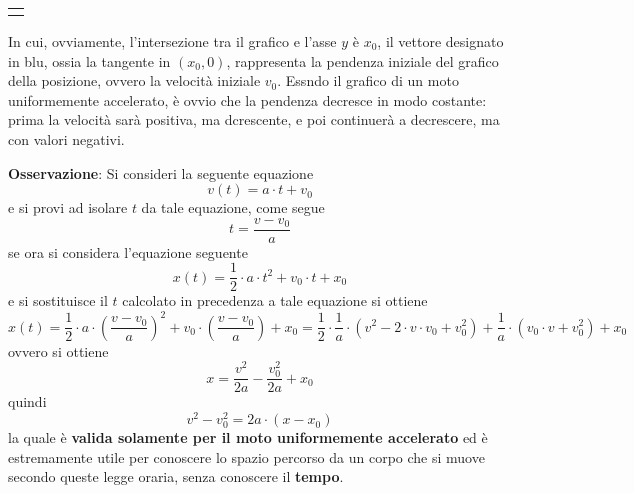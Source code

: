 \documentclass[a4paper]{extarticle}
\begin{document}
\vspace{2em}
\noindent
{}
\begin{tabularx}{\textwidth}{P}
  {
      \centering
  }
\end{tabularx}

\vspace{1em}
\noindent
In cui, ovviamente, l'intersezione tra il grafico e l'asse $y$ è $x_0$, il vettore designato in blu, ossia la tangente in $(x_0,0)$, rappresenta la pendenza iniziale del grafico della posizione, ovvero la velocità iniziale $v_0$. Essndo il grafico di un moto uniformemente accelerato, è ovvio che la pendenza decresce in modo costante: prima la velocità sarà positiva, ma dcrescente, e poi continuerà a decrescere, ma con valori negativi.

\vspace{1em}
\noindent
\textbf{Osservazione}: Si consideri la seguente equazione
\[v(t) = a \cdot t + v_0\]
e si provi ad isolare $t$ da tale equazione, come segue
\[t = \frac{v - v_0}{a}\]
se ora si considera l'equazione seguente
\[x(t) = \frac{1}{2} \cdot a \cdot t^2 + v_0 \cdot t + x_0\]
e si sostituisce il $t$ calcolato in precedenza a tale equazione si ottiene
\[x(t) = \frac{1}{2} \cdot a \cdot \left(\frac{v - v_0}{a}\right)^2 + v_0 \cdot \left(\frac{v - v_0}{a}\right) + x_0 = \frac{1}{2} \cdot \frac{1}{a} \cdot (v^2 - 2 \cdot v \cdot v_0 + v_0^2) + \frac{1}{a} \cdot (v_0 \cdot v + v_0^2) + x_0\]
ovvero si ottiene
\[\boxed{x = \frac{v^2}{2a} - \frac{v_0^2}{2a} + x_0}\]
quindi
\[\boxed{v^2 - v_0^2 = 2a \cdot (x - x_0)}\]
la quale è \textbf{valida solamente per il moto uniformemente accelerato} ed è estremamente utile per conoscere lo spazio percorso da un corpo che si muove secondo queste legge oraria, senza conoscere il \textbf{tempo}.
\end{document}
